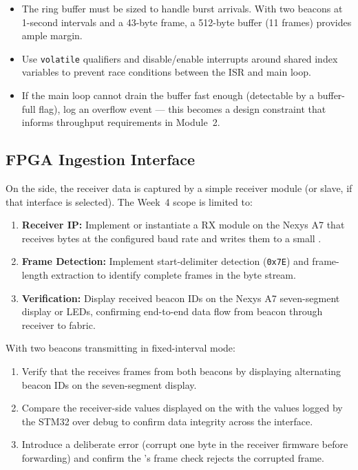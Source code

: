 \documentclass[11pt,letterpaper]{article}
\begin{document}
	\begin{tcolorbox}[warning={Concurrency Considerations}]
		\begin{itemize}
			\item The ring buffer must be sized to handle burst arrivals. With two beacons at 1-second intervals and a 43-byte frame, a 512-byte buffer (11 frames) provides ample margin.
			\item Use \texttt{volatile} qualifiers and disable/enable interrupts around shared index variables to prevent race conditions between the ISR and main loop.
			\item If the main loop cannot drain the buffer fast enough (detectable by a buffer-full flag), log an overflow event --- this becomes a design constraint that informs \FPGA{} throughput requirements in Module~2.
		\end{itemize}
	\end{tcolorbox}
	
	\subsection{FPGA Ingestion Interface}
	
	On the \FPGA{} side, the receiver data is captured by a simple \UART{} receiver module (or \SPI{} slave, if that interface is selected). The Week~4 scope is limited to:
	
	\begin{enumerate}[leftmargin=2em]
		\item \textbf{\UART{} Receiver IP:} Implement or instantiate a \UART{} RX module on the Nexys A7 that receives bytes at the configured baud rate and writes them to a small \FIFO{}.
		\item \textbf{Frame Detection:} Implement start-delimiter detection (\texttt{0x7E}) and frame-length extraction to identify complete frames in the byte stream.
		\item \textbf{Verification:} Display received beacon IDs on the Nexys A7 seven-segment display or LEDs, confirming end-to-end data flow from beacon through receiver to \FPGA{} fabric.
	\end{enumerate}
	
	\begin{tcolorbox}[infobox={Exercise: End-to-End Data Flow Validation}]
		With two beacons transmitting in fixed-interval mode:
		\begin{enumerate}
			\item Verify that the \FPGA{} receives frames from both beacons by displaying alternating beacon IDs on the seven-segment display.
			\item Compare the receiver-side \RSSI{} values displayed on the \FPGA{} with the values logged by the STM32 over \UART{} debug to confirm data integrity across the interface.
			\item Introduce a deliberate \CRC{} error (corrupt one byte in the receiver firmware before forwarding) and confirm the \FPGA{}'s frame \CRC{} check rejects the corrupted frame.
		\end{enumerate}
	\end{tcolorbox}
	
\end{document}
